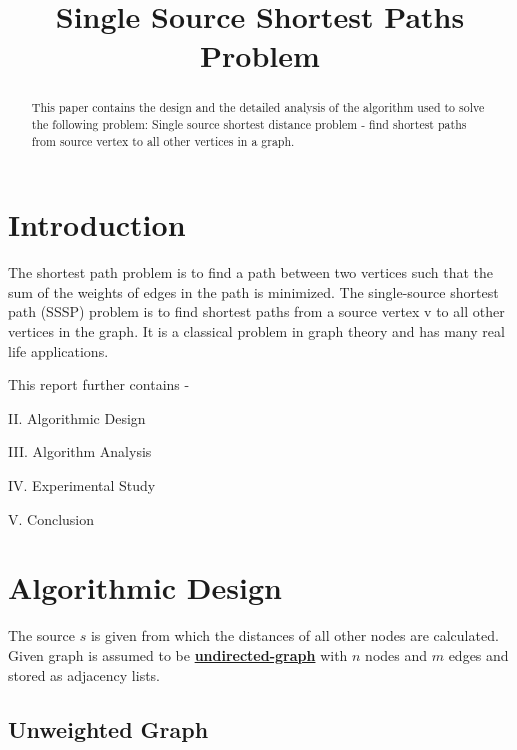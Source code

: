 \documentclass[conference]{IEEEtran}
\begin{document}
\title{Single Source Shortest Paths Problem\\

}

\author{
\and
{}
\and
{}
}

\maketitle

\begin{abstract}
This paper contains the design and the detailed analysis of the algorithm used to solve the following problem: Single source shortest distance problem - find shortest paths from source vertex to all other vertices in a graph.
\end{abstract}
\section{Introduction}
The shortest path problem is to find a path between two vertices such that the sum of the weights of edges in the path is minimized.
The single-source shortest path (SSSP) problem is to find shortest paths from a source vertex v to all other vertices in the graph. It is a classical problem in graph theory and has many real life applications.


This report further contains -

II. Algorithmic Design

III. Algorithm Analysis

IV. Experimental Study

V. Conclusion 

\section{Algorithmic Design}

The source $s$ is given from which the distances of all other nodes are calculated. 
Given graph is assumed to be \href{https://en.wikipedia.org/?title=Undirected_graph&redirect=no}{\textbf{undirected-graph}} with $n$ nodes and $m$ edges and stored as adjacency lists.

\subsection{Unweighted Graph}
\end{document}
